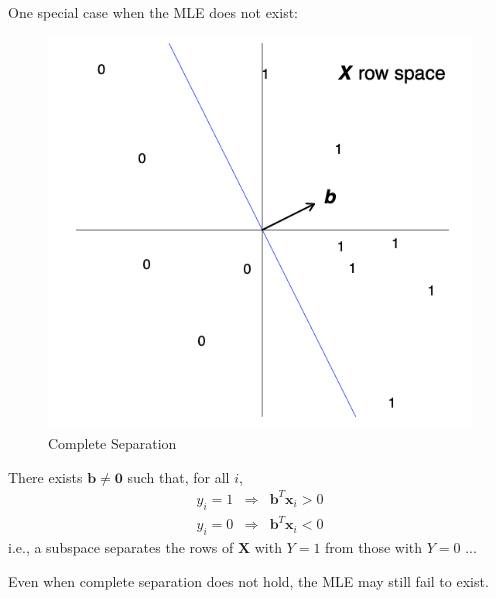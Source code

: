 \documentclass[11pt]{elegantbook}
\begin{document}
One special case when the MLE does not exist:
\begin{center}\begin{figure}[htbp]
    \centering
    \includegraphics[scale=0.3]{complete separation.png}
    \caption{Complete Separation}
    \label{}
\end{figure}\end{center}
\begin{definition}
\normalfont
There exists $\boldsymbol{b} \neq \mathbf{0}$ such that, for all $i$,
$$
\begin{array}{rlr}
    y_i=1 & \Rightarrow & \boldsymbol{b}^T \boldsymbol{x}_i>0\\
    y_i=0 & \Rightarrow & \boldsymbol{b}^T \boldsymbol{x}_i<0
\end{array}
$$
i.e., a subspace separates the rows of $\boldsymbol{X}$ with $Y = 1$ from those with $Y = 0$ ...
\end{definition}
Even when complete separation does not hold, the MLE may still fail to exist.
\end{document}
